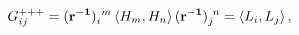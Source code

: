 \begin{equation}
\label{trace}
  G^{+++}_{ij} = ({\bf r^{-1}})_i^{~m}\, \langle H_m,H_n\rangle\, ({\bf
r^{-1}})_j^{~n}=\langle L_i,L_j\rangle\, ,
\end{equation} 
